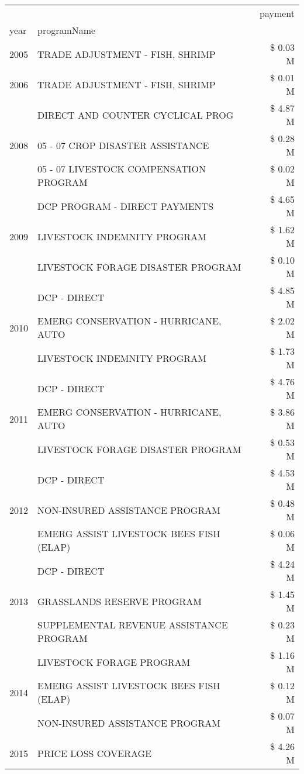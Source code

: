 \begin{tabular}{llr}
\toprule
 &  & payment \\
year & programName &  \\
\midrule
2005 & TRADE ADJUSTMENT - FISH, SHRIMP & \$ 0.03 M \\
\cline{1-3}
2006 & TRADE ADJUSTMENT - FISH, SHRIMP & \$ 0.01 M \\
\cline{1-3}
\multirow[t]{3}{*}{2008} & DIRECT AND COUNTER CYCLICAL PROG & \$ 4.87 M \\
 & 05 - 07 CROP DISASTER ASSISTANCE & \$ 0.28 M \\
 & 05 - 07 LIVESTOCK COMPENSATION PROGRAM & \$ 0.02 M \\
\cline{1-3}
\multirow[t]{3}{*}{2009} & DCP PROGRAM - DIRECT PAYMENTS & \$ 4.65 M \\
 & LIVESTOCK INDEMNITY PROGRAM & \$ 1.62 M \\
 & LIVESTOCK FORAGE DISASTER  PROGRAM & \$ 0.10 M \\
\cline{1-3}
\multirow[t]{3}{*}{2010} & DCP - DIRECT & \$ 4.85 M \\
 & EMERG CONSERVATION - HURRICANE, AUTO & \$ 2.02 M \\
 & LIVESTOCK INDEMNITY PROGRAM & \$ 1.73 M \\
\cline{1-3}
\multirow[t]{3}{*}{2011} & DCP - DIRECT & \$ 4.76 M \\
 & EMERG CONSERVATION - HURRICANE, AUTO & \$ 3.86 M \\
 & LIVESTOCK FORAGE DISASTER PROGRAM & \$ 0.53 M \\
\cline{1-3}
\multirow[t]{3}{*}{2012} & DCP - DIRECT & \$ 4.53 M \\
 & NON-INSURED ASSISTANCE PROGRAM & \$ 0.48 M \\
 & EMERG ASSIST LIVESTOCK BEES FISH (ELAP) & \$ 0.06 M \\
\cline{1-3}
\multirow[t]{3}{*}{2013} & DCP - DIRECT & \$ 4.24 M \\
 & GRASSLANDS RESERVE PROGRAM & \$ 1.45 M \\
 & SUPPLEMENTAL REVENUE ASSISTANCE PROGRAM & \$ 0.23 M \\
\cline{1-3}
\multirow[t]{3}{*}{2014} & LIVESTOCK FORAGE PROGRAM & \$ 1.16 M \\
 & EMERG ASSIST LIVESTOCK BEES FISH (ELAP) & \$ 0.12 M \\
 & NON-INSURED ASSISTANCE PROGRAM & \$ 0.07 M \\
\cline{1-3}
\multirow[t]{3}{*}{2015} & PRICE LOSS COVERAGE & \$ 4.26 M \\

\end{tabular}
